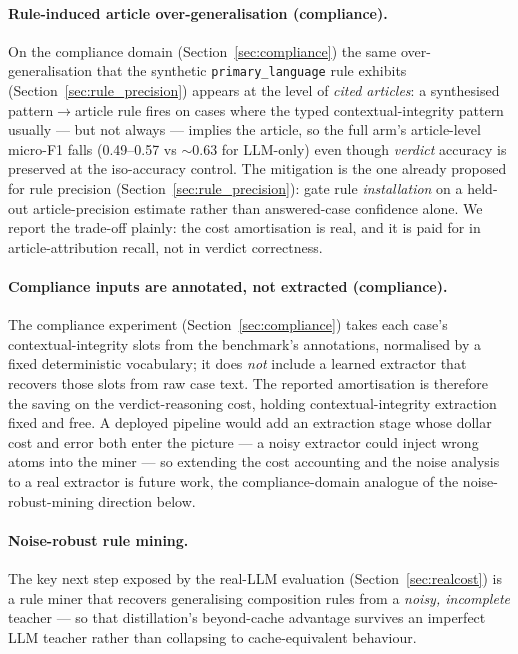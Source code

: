 \documentclass[11pt]{article}
\theoremstyle{plain}
\newcommand{\privArtFOneFullGemini}{0.49}
\newcommand{\privArtFOneLlmGemini}{0.63}
\newcommand{\privArtFOneFullGrok}{0.57}
\begin{document}
\paragraph{Rule-induced article over-generalisation (compliance).} On the
compliance domain (Section~\ref{sec:compliance}) the same over-generalisation
that the synthetic \texttt{primary\_language} rule exhibits
(Section~\ref{sec:rule_precision}) appears at the level of \emph{cited
articles}: a synthesised pattern$\to$article rule fires on cases where the typed
contextual-integrity pattern usually --- but not always --- implies the article,
so the full arm's article-level micro-F1 falls
(\privArtFOneFullGemini--\privArtFOneFullGrok{} vs
${\sim}\privArtFOneLlmGemini{}$ for LLM-only) even though \emph{verdict} accuracy
is preserved at the iso-accuracy control. The mitigation is the one already
proposed for rule precision (Section~\ref{sec:rule_precision}): gate rule
\emph{installation} on a held-out article-precision estimate rather than
answered-case confidence alone. We report the trade-off plainly: the cost
amortisation is real, and it is paid for in article-attribution recall, not in
verdict correctness.

\paragraph{Compliance inputs are annotated, not extracted (compliance).} The
compliance experiment (Section~\ref{sec:compliance}) takes each case's
contextual-integrity slots from the benchmark's annotations, normalised by a
fixed deterministic vocabulary; it does \emph{not} include a learned extractor
that recovers those slots from raw case text. The reported amortisation is
therefore the saving on the verdict-reasoning cost, holding contextual-integrity
extraction fixed and free. A deployed pipeline would add an extraction stage
whose dollar cost and error both enter the picture --- a noisy extractor could
inject wrong atoms into the miner --- so extending the cost accounting and the
noise analysis to a real extractor is future work, the compliance-domain
analogue of the noise-robust-mining direction below.

\paragraph{Noise-robust rule mining.} The key next step exposed by the
real-LLM evaluation (Section~\ref{sec:realcost}) is a rule miner that
recovers generalising composition rules from a \emph{noisy, incomplete}
teacher --- so that distillation's beyond-cache advantage survives an
imperfect LLM teacher rather than collapsing to cache-equivalent behaviour.
\end{document}
